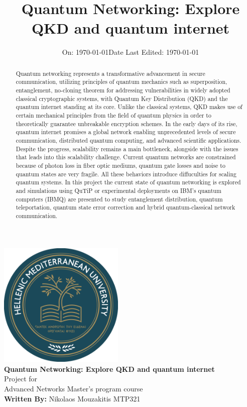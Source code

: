 \documentclass[12pt]{ieeetj}
\title{\LARGE \textbf{Quantum Networking: Explore QKD and quantum internet}}
\author{}
\date{\large On: \today}
\begin{document}
\onecolumn
\makeatletter
\begin{titlepage}
\centering
\vspace* {1cm}
{ \includegraphics[width=6cm]{ELMEPA.png}}\\[1cm]

{\LARGE \textbf{Quantum Networking: Explore QKD and quantum internet}}\\[1cm]
Project for\\[1cm]

	Advanced Networks Master's program course\\[0.5cm]



	\textbf{Written By:} {Nikolaos Mouzakitis MTP321}\\[1cm]
\date{\large Date Last Edited: \today}
{\@date\\}
\end{titlepage}
\makeatother


	\begin{abstract}

		Quantum networking represents a transformative advancement in secure communication,
		utilizing principles of quantum mechanics such as superposition, entanglement, no-cloning theorem for addressing
		vulnerabilities in widely adopted classical cryptographic systems, 
		with Quantum Key Distribution (QKD) and the quantum internet standing at its core.
		Unlike the classical systems, QKD makes use of certain mechanical principles
		from the field of quantum physics in order to theoretically guarantee unbreakable encryption schemes.
		In the early days of its rise, quantum internet promises a global network enabling unprecedented levels of
		secure communication, distributed quantum computing, and advanced scientific applications.
		Despite the progress, scalability remains a main bottleneck, alongside with the issues that leads into this scalability challenge. 
		Current quantum networks are constrained because of photon loss in fiber optic mediums, quantum gate losses and noise to quantum states
		are very fragile. All these behaviors introduce diffuculties for scaling quantum systems.
		In this project the current state of quantum networking is explored and simulations using QuTiP or
		experimental deployments on IBM’s quantum computers (IBMQ) are presented to study entanglement distribution,
		quantum teleportation, quantum state error correction and hybrid quantum-classical network communication.

	\end{abstract}
	
\end{document}
